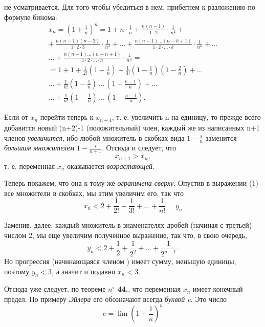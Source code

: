 \documentclass[a5paper, 10pt]{book}
\begin{document}
    \small{не усматривается. Для того чтобы убедиться в нем, прибегнем к разложению по формуле бинома:}
    \begin{eqnarray} 
        x_n = (1 + \frac{1}{n})^n = 1 + n \cdot \frac{1}{n} + \frac{n(n-1)}{1 \cdot 2} \cdot \frac{1}{n^2} + \nonumber\\ +\, \frac{n(n-1)(n-2)}{1 \cdot 2 \cdot 3} \cdot \frac{1}{n^3} + ... + \frac{n(n-1)...(n-k+1)}{1 \cdot 2 \cdot ... \cdot k} \cdot \frac{1}{n^k} + ... \nonumber\\ ... + \frac{n(n-1)...(n-n+1)}{1 \cdot 2 \cdot ... \cdot n} \cdot \frac{1}{n^n} = \nonumber\\ = 1 + 1 + \frac{1}{2!}(1 - \frac{1}{n}) + \frac{1}{3!}(1 - \frac{1}{n})(1 - \frac{2}{n}) + ... \nonumber\\ ... + \frac{1}{k!}(1 - \frac{1}{n})\,...\,(1 - \frac{k-1}{n}) + ... \nonumber\\ ... + \frac{1}{n!}(1 - \frac{1}{n})\,...\,(1 - \frac{n-1}{n}).
    \end{eqnarray}
    \par Если от $x_n$ перейти теперь к $x_{n+1}$, т. е. увеличить n на единицу, то прежде всего добавится новый (n+2)-1 (положительный) член, каждый же из написанных n+1 членов \textit{увеличится}, ибо любой множитель в скобках вида $1 - \frac{s}{n}$ заменится \textit{большим множителем} $1 - \frac{s}{n+1}$. Отсюда и следует, что
    \[x_{n+1} > x_n,\]
    т. е. переменная $x_n$ оказывается \textit{возрастающей}.
    \par Теперь покажем, что она к тому же \textit{ограничена сверху}. Опустив в выражении (1) все множители в скобках, мы этим увеличим его, так что
    \[x_n < 2 + \frac{1}{2!} + \frac{1}{3!} + ... + \frac{1}{n!} = y_n\]
    \par Заменив, далее, каждый множитель в знаменателях дробей (начиная с третьей) числом 2, мы еще увеличим полученное выражение, так что, в свою очередь,
    \[y_n < 2 + \frac{1}{2} + \frac{1}{2^2} + ... + \frac{1}{2^{n-1}}.\]
    Но прогрессия (начинающаяся членом ) имеет сумму, меньшую единицы, поэтому $y_n < 3$, а значит и подавно $x_n < 3$.
    \par Отсюда уже следует, по теореме \textbf{$n^{\circ}$ 44.}, что переменная $x_n$ имеет конечный предел. По примеру \textit{Эйлера} его обозначают всегда \textit{буквой e}. \newline Это число 
    \[e = \lim(1 + \frac{1}{n})^n\]

    \newpage

    \begin{center}
    \end{center}
\end{document}
